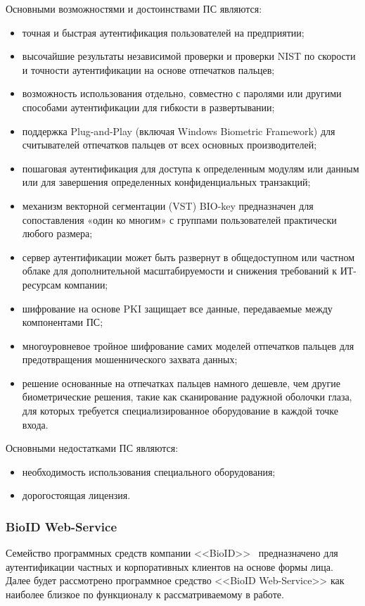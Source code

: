 Основными возможностями и достоинствами ПС являются:
\begin{itemize}
  \item точная и быстрая аутентификация пользователей на предприятии;
  \item высочайшие результаты независимой проверки и проверки NIST по скорости и точности аутентификации на основе отпечатков пальцев;
  \item возможность использования отдельно, совместно с паролями или другими способами аутентификации для гибкости в развертывании;
  \item поддержка Plug-and-Play (включая Windows Biometric Framework) для считывателей отпечатков пальцев от всех основных производителей;
  \item пошаговая аутентификация для доступа к определенным модулям или данным или для завершения определенных конфиденциальных транзакций;
  \item механизм векторной сегментации (VST) BIO-key предназначен для сопоставления «один ко многим» с группами пользователей практически любого размера;
  \item сервер аутентификации может быть развернут в общедоступном или частном облаке для дополнительной масштабируемости и снижения требований к ИТ-ресурсам компании;
  \item шифрование на основе PKI защищает все данные, передаваемые между компонентами ПС;
  \item многоуровневое тройное шифрование самих моделей отпечатков пальцев для предотвращения мошеннического захвата данных;
  \item решение основанные на отпечатках пальцев намного дешевле, чем другие биометрические решения, такие как сканирование радужной оболочки глаза, для которых требуется специализированное оборудование в каждой точке входа.
\end{itemize}

Основными недостатками ПС являются:
\begin{itemize}
  \item необходимость использования специального оборудования;
  \item дорогостоящая лицензия.
\end{itemize}

\subsubsection{BioID Web-Service}
\label{sub:domain:analogs:bioId}
Семейство программных средств компании <<BioID>>~\cite{analogs_bioid} предназначено для аутентификации частных и корпоративных клиентов на основе формы лица. Далее будет рассмотрено программное средство <<BioID Web-Service>> как наиболее близкое по функционалу к рассматриваемому в работе.

